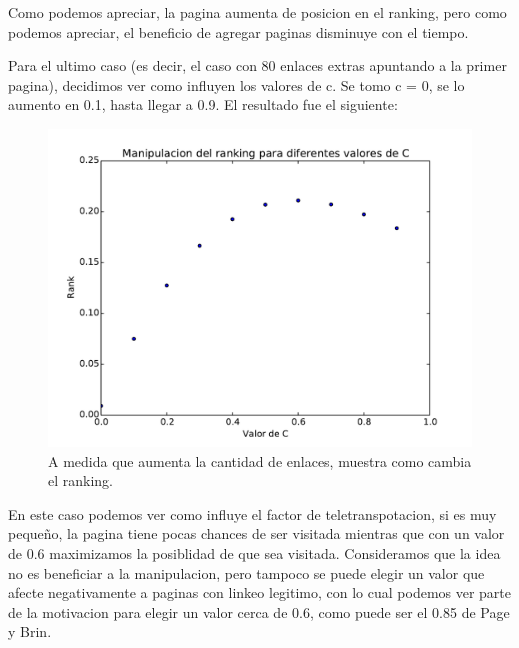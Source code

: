 Como podemos apreciar, la pagina aumenta de posicion en el ranking, pero como podemos apreciar, el beneficio de agregar paginas disminuye con el tiempo.

Para el ultimo caso (es decir, el caso con 80 enlaces extras apuntando a la primer pagina), decidimos ver como influyen los valores de c. Se tomo c = 0, se lo aumento en 0.1, hasta llegar a 0.9. El resultado fue el siguiente:

\begin{figure}[H]
\centering
\includegraphics[scale=0.7]{images/manipulacionC.pdf}
\caption{A medida que aumenta la cantidad de enlaces, muestra como cambia el ranking.}
\label{timePageRank}
\end{figure}

En este caso podemos ver como influye el factor de teletranspotacion, si es muy pequeño, la pagina tiene pocas chances de ser visitada mientras que con un valor de 0.6 maximizamos la posiblidad de que sea visitada. Consideramos que la idea no es beneficiar a la manipulacion, pero tampoco se puede elegir un valor que afecte negativamente a paginas con linkeo legitimo, con lo cual podemos ver parte de la motivacion para elegir un valor cerca de 0.6, como puede ser el 0.85 de Page y Brin.